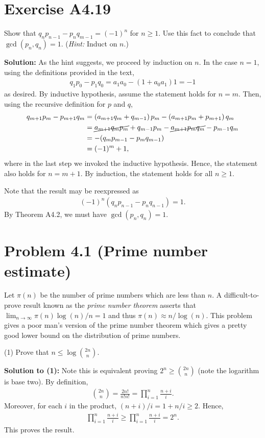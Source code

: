 \documentclass{book}
\begin{document}
\section*{Exercise A4.19}
    Show that $q_n p_{n-1}-p_n q_{m-1}=(-1)^n$ for $n\geq 1$. Use this fact to conclude that $\gcd(p_n,q_n)=1$. (\emph{Hint:} Induct on $n$.)
    
    \textbf{Solution:} As the hint suggests, we proceed by induction on $n$. In the case $n=1$, using the definitions provided in the text,
    \begin{align}
        q_1 p_0-p_1 q_0 = a_1 a_0-(1+a_0 a_1)1 = -1
    \end{align}
    as desired. By inductive hypothesis, assume the statement holds for $n=m$. Then, using the recursive definition for $p$ and $q$,
    \begin{align}
        q_{m+1}p_m - p_{m+1}q_m &= \left(a_{m+1}q_m + q_{m-1}\right)p_m-\left(a_{m+1}p_m+p_{m+1}\right)q_m \\
        &= \cancel{a_{m+1}q_m p_m} + q_{m-1}p_m-\cancel{a_{m+1}p_m q_m} -p_{m-1}q_m \\
        &=-(q_m p_{m-1}-p_m q_{m-1}) \\
        &= (-1)^m+1,
    \end{align}
    where in the last step we invoked the inductive hypothesis. Hence, the statement also holds for $n=m+1$. By induction, the statement holds for all $n\geq 1$.
    
    Note that the result may be reexpressed as 
    \begin{align}
        (-1)^n(q_n p_{n-1}-p_n q_{n-1}) = 1.
    \end{align}
    By Theorem A4.2, we must have $\gcd(p_n,q_n)=1$.

\section*{Problem 4.1 (Prime number estimate)}
    Let $\pi(n)$ be the number of prime numbers which are less than $n$. A difficult-to-prove result known as the \emph{prime number theorem} asserts that $\lim_{n\rightarrow\infty} \pi(n)\log(n)/n=1$ and thus $\pi(n) \approx n/\log(n)$. This problem gives a poor man's version of the prime number theorem which gives a pretty good lower bound on the distribution of prime numbers.
    
    (1) Prove that $n\leq \log \binom{2n}{n}$. 

    \textbf{Solution to (1):} Note this is equivalent proving $2^n \geq {\binom{2n}{n}}$ (note the logarithm is base two). By definition,
    \begin{align}
        \binom{2n}{n} = \frac{2n!}{n!n!} = \prod_{i=1}^n \frac{n+i}{i}.
    \end{align}
    Moreover, for each $i$ in the product, $(n+i)/i  = 1 + n/i \geq 2$. Hence,
    \begin{align}
        \prod_{i=1}^n \frac{n+i}{i} \geq \prod_{i=1}^n \frac{n+i}{i} = 2^n.
    \end{align}
    This proves the result.
\end{document}

